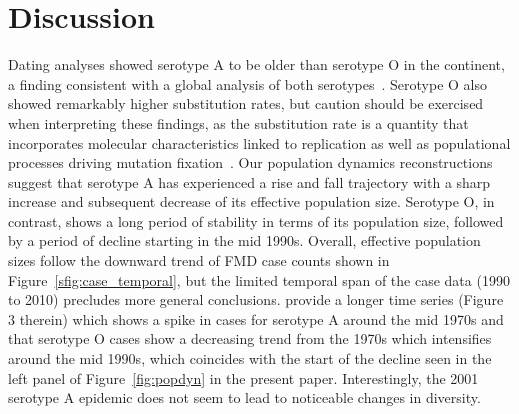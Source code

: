\documentclass[10pt]{article}
\begin{document}
\section*{Discussion}

Dating analyses showed serotype A to be older than serotype O in the continent, a finding consistent with a global analysis of both serotypes~\citep{Tully2008}.
Serotype O also showed remarkably higher substitution rates, but caution should be exercised when interpreting these findings, as the substitution rate is a quantity that incorporates molecular characteristics linked to replication as well as populational processes driving mutation fixation~\citep{Holmes2016}.
Our population dynamics reconstructions suggest that serotype A has experienced a rise and fall trajectory with a sharp increase and subsequent decrease of its effective population size.
Serotype O, in contrast, shows a long period of stability in terms of its population size, followed by a period of decline starting in the mid 1990s. %
Overall, effective population sizes follow the downward trend of FMD case counts shown in Figure~\ref{sfig:case_temporal}, but the limited temporal span of the case data (1990 to 2010) precludes more general conclusions.
\citet{Naranjo2013} provide a longer time series (Figure 3 therein) which shows a spike in cases for serotype A around the mid 1970s and that serotype O cases show a decreasing trend from the 1970s which intensifies around the mid 1990s, which coincides with the start of the decline seen in the left panel of Figure~\ref{fig:popdyn} in the present paper.
Interestingly, the 2001 serotype A epidemic does not seem to lead to noticeable changes in diversity. %
\end{document}
